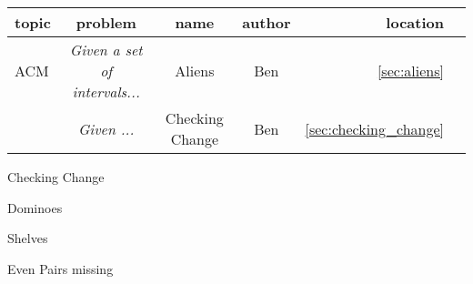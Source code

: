 \documentclass[a4paper, 11pt]{article}
\newcommand{\includecode}[1]{
    }
\begin{document}
    \begin{tabular}{ l  c  c  c  r  r}
        topic & problem & name & author & location\\
      \hline
        ACM & \textit{Given a set of intervals...} & Aliens & Ben & \ref{sec:aliens} \\
        & \textit{Given ...} & Checking Change & Ben & \ref{sec:checking_change} \\
    \end{tabular}
    
    \begin{section}{Checking Change}
        \label{sec:aliens}
        \includecode{../problems/w01/Checking_Change/CheckingChange1.cpp}
    \end{section}
    
    \begin{section}{Dominoes}
        \label{sec:aliens}
        \includecode{../problems/w01/Dominoes/Dominoes1.cpp}
    \end{section}
    
    \begin{section}{Shelves}
        \label{sec:aliens}
        \includecode{../problems/w01/Shelves/Shelves1.cpp}
    \end{section}
    
    Even Pairs missing
    
    
\end{document}
